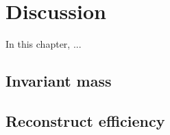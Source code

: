 \chapter{Discussion} \label{Discussion}

In this chapter, ...

\section{Invariant mass}\label{sec:inv mass}


\section{Reconstruct efficiency}\label{sec:reco eff}




